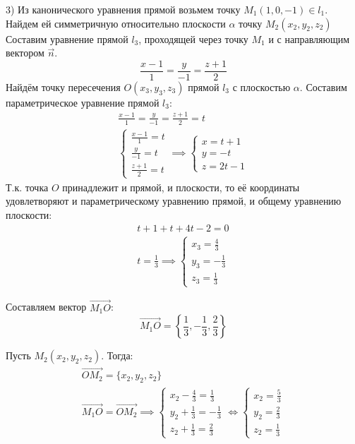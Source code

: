 \begin{eg}
  3) Из канонического уравнения прямой возьмем точку $M_1(1, 0, -1) \in l_1$. 
  Найдем ей симметричную относительно плоскости $\alpha$ точку $M_2(x_2, y_2, z_2)$
  Составим уравнение прямой $l_3$, проходящей через точку $M_1$ и с направляющим вектором $\vec{n}$. \[
    \frac{x - 1}{1} = \frac{y}{-1} = \frac{z + 1}{2}
  \] 
  Найдём точку пересечения $O(x_3, y_3, z_3)$ прямой $l_3$ с плоскостью $\alpha$. 
  Составим параметрическое уравнение прямой $l_3$:
  \begin{gather*}
    \frac{x - 1}{1} = \frac{y}{-1} = \frac{z + 1}{2} = t \\
    \begin{cases}
      \frac{x - 1}{1} = t \\
      \frac{y}{-1} = t \\
      \frac{z + 1}{2} = t
    \end{cases} \implies
    \begin{cases}
      x = t + 1 \\
      y = -t \\
      z = 2t - 1
    \end{cases}
  \end{gather*}
  Т.к. точка $O$ принадлежит и прямой, и плоскости, то её координаты удовлетворяют и параметрическому уравнению прямой, и общему уравнению плоскости:
  \begin{gather*}
    t + 1 + t + 4t - 2 = 0 \\
    t = \frac{1}{3} \implies \begin{cases}
      x_3 = \frac{4}{3} \\
      y_3 = -\frac{1}{3} \\
      z_3 = \frac{1}{3}
    \end{cases}
  \end{gather*}

  Составляем вектор $\overrightarrow{M_1O}$: \[
  \overrightarrow{M_1O} = \left\{\frac{1}{3}, -\frac{1}{3}, \frac{2}{3}\right\} 
  \] 

  Пусть $M_2(x_2, y_2, z_2)$. Тогда:
  \begin{gather*}
    \overrightarrow{OM_2} = \{x_2, y_2, z_2\} \\
    \overrightarrow{M_1O} = \overrightarrow{OM_2} \implies \begin{cases}
      x_2 - \frac{4}{3} = \frac{1}{3} \\
      y_2 + \frac{1}{3} = -\frac{1}{3} \\
      z_2 + \frac{1}{3} = \frac{2}{3}
    \end{cases} \iff \begin{cases}
      x_2 = \frac{5}{3} \\
      y_2 = \frac{2}{3} \\
      z_2 = \frac{1}{3}
    \end{cases}
  \end{gather*}


\end{eg}
